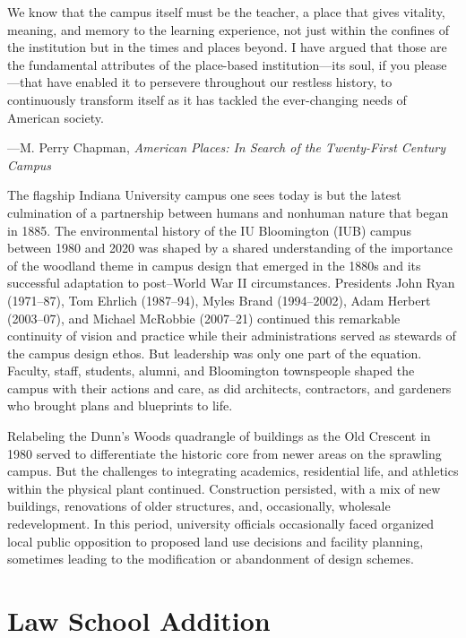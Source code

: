 \documentclass[
  american,
  letterpaper,
]{scrreprt}
\begin{document}
\epigraph{
We know that the campus itself must be the teacher, a place that gives vitality, meaning, and memory to the learning experience, not just within the confines of the institution but in the times and places beyond. I have argued that those are the fundamental attributes of the place-based institution---its soul, if you please---that have enabled it to persevere throughout our restless history, to continuously transform itself as it has tackled the ever-changing needs of American society.  
}
{---M. Perry Chapman, \textit{American Places: In Search of the Twenty-First Century Campus}}

The flagship Indiana University campus one sees today is but the latest
culmination of a partnership between humans and nonhuman nature that
began in 1885. The environmental history of the IU Bloomington (IUB)
campus between 1980 and 2020 was shaped by a shared understanding of the
importance of the woodland theme in campus design that emerged in the
1880s and its successful adaptation to post--World War II circumstances.
Presidents John Ryan (1971--87), Tom Ehrlich (1987--94), Myles Brand
(1994--2002), Adam Herbert (2003--07), and Michael McRobbie (2007--21)
continued this remarkable continuity of vision and practice while their
administrations served as stewards of the campus design ethos. But
leadership was only one part of the equation. Faculty, staff, students,
alumni, and Bloomington townspeople shaped the campus with their actions
and care, as did architects, contractors, and gardeners who brought
plans and blueprints to life.

Relabeling the Dunn's Woods quadrangle of buildings as the Old Crescent
in 1980 served to differentiate the historic core from newer areas on
the sprawling campus. But the challenges to integrating academics,
residential life, and athletics within the physical plant continued.
Construction persisted, with a mix of new buildings, renovations of
older structures, and, occasionally, wholesale redevelopment. In this
period, university officials occasionally faced organized local public
opposition to proposed land use decisions and facility planning,
sometimes leading to the modification or abandonment of design schemes.

\section{Law School Addition}\label{law-school-addition}
\end{document}

